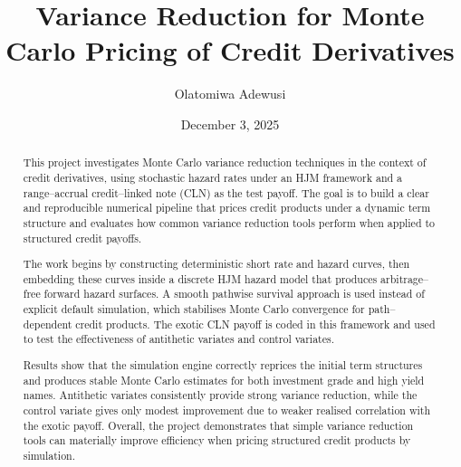 \documentclass[11pt]{article}
\title{Variance Reduction for Monte Carlo Pricing of Credit Derivatives}
\author{Olatomiwa Adewusi}
\date{December 3, 2025}
\begin{document}
\maketitle

\tableofcontents

\begin{abstract}
This project investigates Monte Carlo variance reduction techniques in the context of credit derivatives, using stochastic hazard rates under an HJM framework and a range–accrual credit–linked note (CLN) as the test payoff. The goal is to build a clear and reproducible numerical pipeline that prices credit products under a dynamic term structure and evaluates how common variance reduction tools perform when applied to structured credit payoffs.

The work begins by constructing deterministic short rate and hazard curves, then embedding these curves inside a discrete HJM hazard model that produces arbitrage–free forward hazard surfaces. A smooth pathwise survival approach is used instead of explicit default simulation, which stabilises Monte Carlo convergence for path–dependent credit products. The exotic CLN payoff is coded in this framework and used to test the effectiveness of antithetic variates and control variates.

Results show that the simulation engine correctly reprices the initial term structures and produces stable Monte Carlo estimates for both investment grade and high yield names. Antithetic variates consistently provide strong variance reduction, while the control variate gives only modest improvement due to weaker realised correlation with the exotic payoff. Overall, the project demonstrates that simple variance reduction tools can materially improve efficiency when pricing structured credit products by simulation.
\end{abstract}














\end{document}
